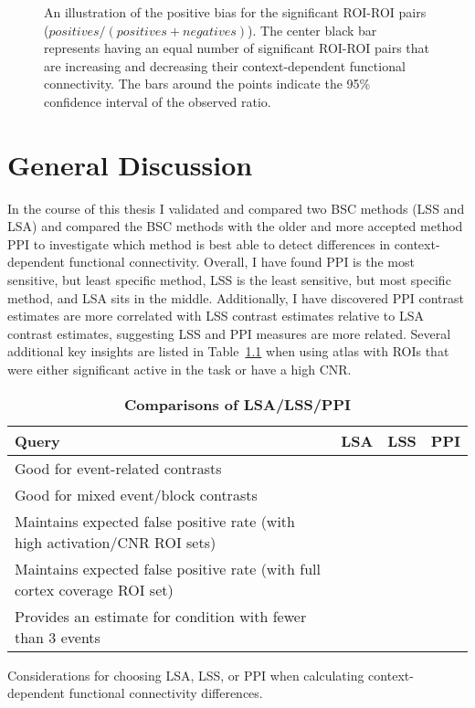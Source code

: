 \documentclass[phd,appendix,figures]{uithesis}
\newcommand{\cmark}{\ding{51}}%
\newcommand{\xmark}{\ding{55}}%
\begin{document}
\begin{figure}[H]
  \centering
  \hfill

  \caption[Positive bias of LSA/LSS/PPI in Schaefer Atlas]{
    An illustration of the positive bias for the significant ROI-ROI pairs
    ($positives / (positives + negatives)$).
    The center black bar represents having an equal number of significant
    ROI-ROI pairs that are increasing and decreasing their context-dependent
    functional connectivity.
    The bars around the points indicate the 95\% confidence interval
    of the observed ratio.
  }
  \label{fig:positive_bias_schaefer}
\end{figure}
\chapter{General Discussion}

In the course of this thesis I validated and compared two BSC methods (LSS and LSA) and compared
the BSC methods with the older and more accepted method PPI to investigate
which method is best able to detect differences in context-dependent functional
connectivity.
Overall, I have found PPI is the most sensitive, but least specific method, LSS
is the least sensitive, but most specific method, and LSA sits in the middle.
Additionally, I have discovered PPI contrast estimates are more correlated
with LSS contrast estimates relative to LSA contrast estimates, suggesting
LSS and PPI measures are more related.
Several additional key insights are listed in Table~\ref{table:comparison} when using
atlas with ROIs that were either significant active in the task or have a high CNR.

\begin{table}[H]
  \centering
  \caption{
  {\bf Comparisons of LSA/LSS/PPI}}
  \begin{tabular}{|p{}|c|c|c|}
  \hline
  \textbf{Query} & \textbf{LSA} & \textbf{LSS} & \textbf{PPI}\\ \hline
  Good for event-related contrasts & \xmark & \xmark & \cmark\\ \hline
  Good for mixed event/block contrasts & \cmark & \cmark & \cmark\\ \hline
  Maintains expected false positive rate (with high activation/CNR ROI sets) & \xmark & \cmark & \xmark\\ \hline
  Maintains expected false positive rate (with full cortex coverage ROI set) & \xmark & \xmark & \xmark\\ \hline
  Provides an estimate for condition with fewer than 3 events & \xmark & \xmark & \cmark\\ \hline
  \end{tabular}

  Considerations for choosing LSA, LSS, or PPI when calculating context-dependent
  functional connectivity differences.
  \label{table:comparison}
\end{table}
\end{document}
